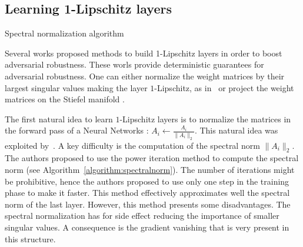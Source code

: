  

\subsection{Learning 1-Lipschitz layers}


\begin{algorithm}[tb]
  \caption{Spectral normalization algorithm}
  \label{algorithm:spectralnorm}
  \begin{algorithmic}
  \end{algorithmic}
  \end{algorithm}
Several works proposed methods to build 1-Lipschitz layers in order to boost adversarial robustness. These worls provide deterministic guarantees for adversarial robustness. One can either normalize the weight matrices by their largest singular values making the layer $1$-Lipschitz, as in~\citep{yoshida2017spectral,miyato2018spectral,farnia2018generalizable,anil2019sorting} or project the weight matrices on the Stiefel manifold \citep{li2019preventing,trockman2021orthogonalizing,skew2021sahil}.

The first natural idea to learn $1$-Lipschitz layers is to normalize the matrices in the forward pass of a Neural Networks : $A_i\leftarrow \frac{A_i}{\lVert A_i\rVert_2}$. This natural idea was exploited by~\citet{miyato2018spectral}. A key difficulty is the computation of the spectral norm $\lVert A_i\rVert_2$. The authors proposed to use the power iteration method to compute the spectral norm (see Algorithm~\ref{algorithm:spectralnorm}). The number of iterations might be prohibitive, hence the authors proposed to use only one step in the training phase to make it faster. This method effectively approximates well the spectral norm of the last layer. However, this method presents some disadvantages. The spectral normalization has for side effect reducing the  importance of smaller singular values. A consequence is the gradient vanishing that is very present in this structure. 

